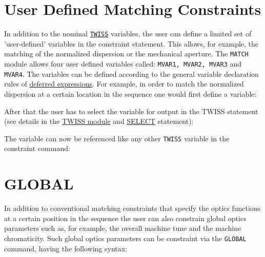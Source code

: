 \section{User Defined Matching Constraints}
\label{sec:userconstraint}

In addition to the nominal \hyperref[chap:twiss]{\tt TWISS} variables, 
the user can define a limited
set of 'user-defined' variables in the constraint statement. This
allows, for example, the matching of the normalized dispersion or the
mechanical aperture. The {\tt MATCH} module allows four user defined variables
called: {\tt MVAR1, MVAR2, MVAR3} and {\tt MVAR4}. 
The variables can be defined according to the general variable
declaration rules of \hyperref[sec:defer]{deferred expressions}.
For example, in order to match the normalized dispersion at a certain
location in the sequence one would first define a variable:


After that the user has to select the variable for output in the TWISS
statement (see details in the \hyperref[chap:twiss]{TWISS module} and 
\hyperref[sec:select]{SELECT} statement):

The variable can now be referenced like any other {\tt TWISS} variable
in the constraint command:

\section{GLOBAL}
\label{sec:global}

In addition to conventional matching constraints that specify the optics 
functions at a certain position in the sequence the user can also constrain 
global optics parameters such as, for example, the overall machine tune
and the machine chromaticity. Such global optics parameters can be
constraint via the {\tt GLOBAL} command, having the following syntax:



